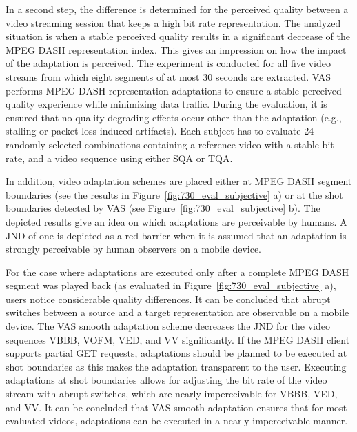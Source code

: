 In a second step, the difference is determined for the perceived quality between a video streaming session that keeps a high bit rate representation. 
The analyzed situation is when a stable perceived quality results in a significant decrease of the \ac{MPEG} \ac{DASH} representation index. This gives an impression on how the impact of the adaptation is perceived. 
The experiment is conducted for all five video streams from which eight segments of at most 30 seconds are extracted.
\ac{VAS} performs \ac{MPEG} \ac{DASH} representation adaptations to ensure a stable perceived quality experience while minimizing data traffic. 
During the evaluation, it is ensured that no quality-degrading effects occur other than the adaptation (e.g., stalling or packet loss induced artifacts). Each subject has to evaluate 24 randomly selected combinations containing a reference video with a stable bit rate, and a video sequence using either  \ac{SQA} or \ac{TQA}.

In addition, video  adaptation schemes are placed either at \ac{MPEG} \ac{DASH} segment boundaries (see the results in Figure~\ref{fig:730_eval_subjective} a) or at the shot boundaries detected by \ac{VAS} (see Figure~\ref{fig:730_eval_subjective} b).
The depicted results give an idea on which adaptations are perceivable by humans.
A \ac{JND} of one is depicted as a red barrier when it is assumed that an adaptation is strongly perceivable by human observers on a mobile device.
 
For the case where adaptations are executed only after a complete \ac{MPEG} \ac{DASH} segment was played back (as evaluated in Figure~\ref{fig:730_eval_subjective} a), users notice considerable quality differences. 
It can be concluded that abrupt switches between a source and a target representation are observable on a mobile device.
The \ac{VAS} smooth adaptation scheme decreases the \ac{JND} for the video sequences VBBB, VOFM, VED, and VV significantly.
If the \ac{MPEG} \ac{DASH} client supports partial GET requests, adaptations should be planned to be executed at shot boundaries as this makes the adaptation transparent to the user.
Executing adaptations at shot boundaries allows for adjusting the bit rate of the video stream with abrupt switches, which are nearly imperceivable for VBBB, VED, and VV. 
It can be concluded that \ac{VAS} smooth adaptation ensures that for most evaluated videos, adaptations can be executed in a nearly imperceivable manner. 
